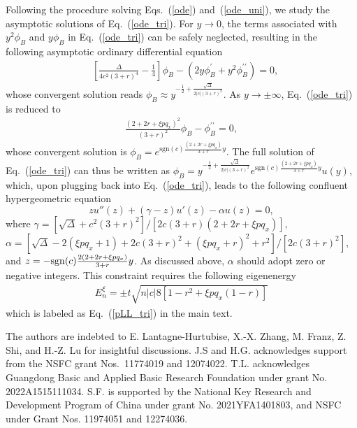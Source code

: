 \documentclass[aps, twocolumn, floatfix, superscriptaddress, prb]{revtex4-1}
\begin{document}
Following the procedure solving Eqs.~(\ref{ode}) and~(\ref{ode_uni}), we study the asymptotic solutions of Eq.~(\ref{ode_tri}). For $y\rightarrow 0$, the terms associated with $y^2\phi_B$ and $y\phi_B$ in Eq.~(\ref{ode_tri}) can be safely neglected, resulting in the following asymptotic ordinary differential equation
%
\begin{align}
&\left[\frac{\Delta}{4c^2(3+r)^4}-\frac{1}{4}\right]\phi_B-\left(2y \phi^\prime_B+y^2 \phi_B^{\prime\prime}\right)=0,
\end{align}
%
whose convergent solution reads $\phi_B\approx y^{-\frac12+\frac{\sqrt{\Delta}}{2|c|(3+r)^2}}$. As ${y\rightarrow\pm\infty}$, Eq.~(\ref{ode_tri}) is reduced to
%
\begin{align}
{
\frac{(2+2r+\xi pq_x)^2}{(3+r)^2}\phi_B - \phi_B^{\prime\prime}=0,
}
\end{align}
%
whose convergent solution is {$\phi_B=e^{\text{sgn}(c)\frac{(2+2r+\xi pq_x)}{3+r}y}$}. The full solution of Eq.~(\ref{ode_tri}) can thus be written as {$\phi_B=y^{-\frac12+\frac{\sqrt{\Delta}}{2|c|(3+r)^2}}e^{\text{sgn}(c)\frac{(2+2r+\xi pq_x)}{3+r}y}u(y)$}, which, upon plugging back into Eq.~(\ref{ode_tri}), leads to the following confluent hypergeometric equation
%
\begin{equation}
zu''(z)+(\gamma-z)u'(z)-\alpha u(z)=0,
\end{equation}
%
{where $\gamma=[\sqrt\Delta+c^2(3+r)^2]/[2c(3+r)(2+2r+\xi pq_x)]$, $\alpha=[\sqrt{\Delta}-2(\xi pq_x+1)+2c(3+r)^2+(\xi pq_x+r)^2+r^2]/[2c(3+r)^2]$, and $z=-{\rm sgn}(c)\frac{2(2+2r+\xi pq_x)}{3+r}y$}. As discussed above, $\alpha$ should adopt zero or negative integers. This constraint requires the following eigenenergy
%
\begin{align}
E_n^\xi=\pm t\sqrt{n|c|8\left[1-r^2+\xi pq_x(1-r)\right]}
\end{align}
%
which is labeled as Eq.~(\ref{pLL_tri}) in the main text.




\begin{acknowledgments}
The authors are indebted to E. Lantagne-Hurtubise, X.-X. Zhang, M. Franz, Z. Shi, and H.-Z. Lu for insightful discussions. J.S and H.G. acknowledges support from the NSFC grant Nos.~11774019 and 12074022. T.L. acknowledges Guangdong Basic and Applied Basic Research Foundation under grant No. 2022A1515111034. S.F. is supported by the National Key Research and Development Program of China under grant No. 2021YFA1401803, and NSFC under Grant Nos. 11974051 and 12274036.
\end{acknowledgments}




\end{document}
